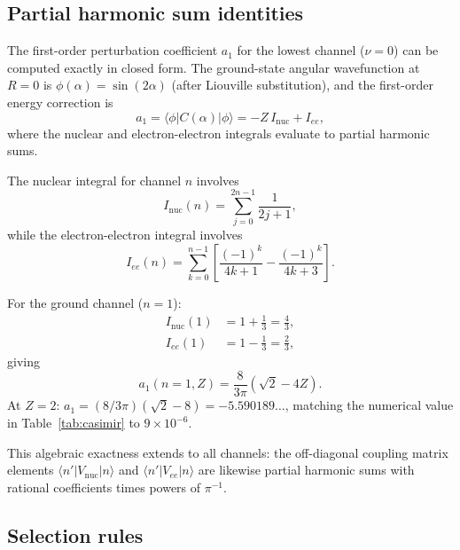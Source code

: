 \documentclass[aps,pra,twocolumn,superscriptaddress,longbibliography]{revtex4-2}
\begin{document}
\subsection{Partial harmonic sum identities}
\label{sec:harmonic_sums}

The first-order perturbation coefficient $a_1$ for the lowest
channel ($\nu = 0$) can be computed exactly in closed form.  The
ground-state angular wavefunction at $R = 0$ is
$\phi(\alpha) = \sin(2\alpha)$ (after Liouville substitution),
and the first-order energy correction is
\begin{equation}
  a_1 = \langle \phi | C(\alpha) | \phi \rangle
  = -Z\,I_{\mathrm{nuc}} + I_{ee},
  \label{eq:a1_general}
\end{equation}
where the nuclear and electron-electron integrals evaluate to
partial harmonic sums.

The nuclear integral for channel $n$ involves
\begin{equation}
  I_{\mathrm{nuc}}(n) = \sum_{j=0}^{2n-1} \frac{1}{2j+1},
  \label{eq:I_nuc}
\end{equation}
while the electron-electron integral involves
\begin{equation}
  I_{ee}(n) = \sum_{k=0}^{n-1}
  \left[\frac{(-1)^k}{4k+1} - \frac{(-1)^k}{4k+3}\right].
  \label{eq:I_ee}
\end{equation}

For the ground channel ($n = 1$):
\begin{align}
  I_{\mathrm{nuc}}(1) &= 1 + \tfrac{1}{3} = \tfrac{4}{3}, \\
  I_{ee}(1) &= 1 - \tfrac{1}{3} = \tfrac{2}{3},
\end{align}
giving
\begin{equation}
  a_1(n{=}1, Z) = \frac{8}{3\pi}\!\left(\sqrt{2} - 4Z\right).
  \label{eq:a1_exact}
\end{equation}
At $Z = 2$: $a_1 = (8/3\pi)(\sqrt{2} - 8) = -5.590189\ldots$,
matching the numerical value in Table~\ref{tab:casimir} to
$9 \times 10^{-6}$.

This algebraic exactness extends to all channels: the off-diagonal
coupling matrix elements $\langle n' | V_{\mathrm{nuc}} | n \rangle$
and $\langle n' | V_{ee} | n \rangle$ are likewise partial harmonic
sums with rational coefficients times powers of $\pi^{-1}$.

\subsection{Selection rules}
\label{sec:selection_rules}
\end{document}
